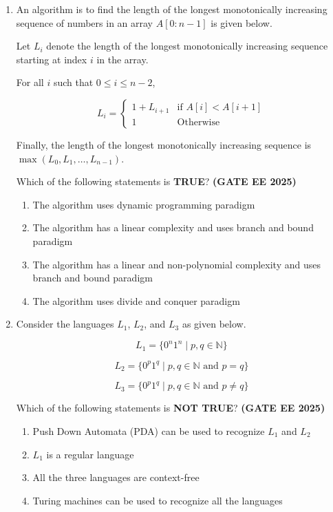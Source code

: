 \documentclass[journal,12pt,onecolumn]{IEEEtran}
\theoremstyle{remark}
\begin{document}
\begin{enumerate}
\item An algorithm is to find the length of the longest monotonically increasing sequence of numbers in an array $ A[0: n-1] $ is given below.

Let $ L_i $ denote the length of the longest monotonically increasing sequence starting at index $ i $ in the array.

For all $ i $ such that $ 0 \leq i \leq n - 2 $,


\[
L_i = 
\begin{cases} 
1 + L_{i+1} & \text{if } A[i] < A[i+1] \\
1 & \text{Otherwise}
\end{cases}
\]



Finally, the length of the longest monotonically increasing sequence is $ \max (L_0, L_1, \ldots, L_{n-1}) $.

Which of the following statements is \textbf{TRUE}? \hfill \textbf{(GATE EE 2025)}

\begin{enumerate}
    \item The algorithm uses dynamic programming paradigm
    \item The algorithm has a linear complexity and uses branch and bound paradigm
    \item The algorithm has a linear and non-polynomial complexity and uses branch and bound paradigm
    \item The algorithm uses divide and conquer paradigm
\end{enumerate}



\item  Consider the languages $ L_1 $, $ L_2 $, and $ L_3 $ as given below.



\[
L_1 = \{0^n1^n \mid p, q \in \mathbb{N}\}
\]




\[
L_2 = \{0^p1^q \mid p, q \in \mathbb{N} \text{ and } p = q\}
\]




\[
L_3 = \{0^p1^q \mid p, q \in \mathbb{N} \text{ and } p \neq q\}
\]


 Which of the following statements is \textbf{NOT TRUE}?
\hfill \textbf{(GATE EE 2025)}




\begin{enumerate}
    \item Push Down Automata (PDA) can be used to recognize $ L_1 $ and $ L_2 $
    \item $ L_1 $ is a regular language
    \item All the three languages are context-free
    \item Turing machines can be used to recognize all the languages
\end{enumerate}




\end{enumerate}
\end{document}
